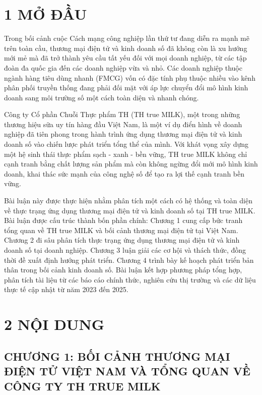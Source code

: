 \section*{1 MỞ ĐẦU}

Trong bối cảnh cuộc Cách mạng công nghiệp lần thứ tư đang diễn ra mạnh
mẽ trên toàn cầu, thương mại điện tử và kinh doanh số đã không còn là xu
hướng mới mẻ mà đã trở thành yêu cầu tất yếu đối với mọi doanh nghiệp,
từ các tập đoàn đa quốc gia đến các doanh nghiệp vừa và nhỏ. Các doanh
nghiệp thuộc ngành hàng tiêu dùng nhanh (FMCG) vốn có đặc tính phụ
thuộc nhiều vào kênh phân phối truyền thống đang phải đối mặt với áp lực
chuyển đổi mô hình kinh doanh sang môi trường số một cách toàn diện và
nhanh chóng.

Công ty Cổ phần Chuỗi Thực phẩm TH (TH true MILK), một trong những
thương hiệu sữa uy tín hàng đầu Việt Nam, là một ví dụ điển hình về
doanh nghiệp đã tiên phong trong hành trình ứng dụng thương mại điện tử
và kinh doanh số vào chiến lược phát triển tổng thể của mình. Với khát
vọng xây dựng một hệ sinh thái thực phẩm sạch - xanh - bền vững, TH true
MILK không chỉ cạnh tranh bằng chất lượng sản phẩm mà còn không ngừng
đổi mới mô hình kinh doanh, khai thác sức mạnh của công nghệ số để tạo
ra lợi thế cạnh tranh bền vững.

Bài luận này được thực hiện nhằm phân tích một cách có hệ thống và toàn
diện về thực trạng ứng dụng thương mại điện tử và kinh doanh số tại TH
true MILK. Bài luận được cấu trúc thành bốn phần chính: Chương 1 cung
cấp bức tranh tổng quan về TH true MILK và bối cảnh thương mại điện tử
tại Việt Nam. Chương 2 đi sâu phân tích thực trạng ứng dụng thương mại
điện tử và kinh doanh số tại doanh nghiệp. Chương 3 luận giải các cơ hội
và thách thức, đồng thời đề xuất định hướng phát triển. Chương 4 trình
bày kế hoạch phát triển bản thân trong bối cảnh kinh doanh số. Bài luận
kết hợp phương pháp tổng hợp, phân tích tài liệu từ các báo cáo chính
thức, nghiên cứu thị trường và các dữ liệu thực tế cập nhật từ năm 2023
đến 2025.

\section*{2 NỘI DUNG}

\subsection*{CHƯƠNG 1: BỐI CẢNH THƯƠNG MẠI ĐIỆN TỬ VIỆT NAM VÀ TỔNG QUAN
VỀ CÔNG TY TH TRUE
MILK}\label{chux1b0ux1a1ng-1-bux1ed1i-cux1ea3nh-thux1b0ux1a1ng-mux1ea1i-ux111iux1ec7n-tux1eed-viux1ec7t-nam-vuxe0-tux1ed5ng-quan-vux1ec1-cuxf4ng-ty-th-true-milk}

